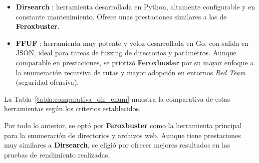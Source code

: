 \begin{parskipenv}
\begin{itemize}
    \item \textbf{Dirsearch} \cite{dirsearch}: herramienta desarrollada en Python, altamente configurable y en constante mantenimiento. Ofrece unas prestaciones similares a las de \textbf{Feroxbuster}.

    \item \textbf{FFUF} \cite{ffuf}: herramienta muy potente y veloz desarrollada en Go, con salida en JSON, ideal para tareas de fuzzing de directorios y parámetros. Aunque comparable en prestaciones, se priorizó \textbf{Feroxbuster} por su mayor enfoque a la enumeración recursiva de rutas y mayor adopción en entornos \textit{Red Team} (seguridad ofensiva).
\end{itemize}

La Tabla~\ref{tabla:comparativa_dir_enum} muestra la comparativa de estas herramientas según los criterios establecidos.

\begin{table}[H]
\centering
\renewcommand{\arraystretch}{1.4}
\caption{Comparativa de herramientas para enumeración de directorios web.}
\label{tabla:comparativa_dir_enum}
\end{table}

Por todo lo anterior, se optó por \textbf{Feroxbuster} como la herramienta principal para la enumeración de directorios y archivos web. Aunque tiene prestaciones muy similares a \textbf{Dirsearch}, se eligió por ofrecer mejores resultados en las pruebas de rendimiento realizadas.


\end{parskipenv}
